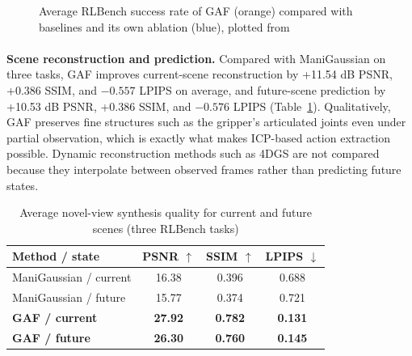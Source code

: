 \documentclass[12pt,a4paper,final]{extreport}
\begin{document}
\begin{figure}[htbp]
\centering
{}
\caption{Average RLBench success rate of GAF (orange) compared with baselines and its own ablation (blue), plotted from \cite{p2}}
\label{fig:gaf_chart}
\end{figure}

\paragraph{} \textbf{Scene reconstruction and prediction.} Compared with ManiGaussian on three tasks, GAF improves current-scene reconstruction by +11.54 dB PSNR, +0.386 SSIM, and $-0.557$ LPIPS on average, and future-scene prediction by +10.53 dB PSNR, +0.386 SSIM, and $-0.576$ LPIPS (Table~\ref{tab:gaf_nvs}). Qualitatively, GAF preserves fine structures such as the gripper's articulated joints even under partial observation, which is exactly what makes ICP-based action extraction possible. Dynamic reconstruction methods such as 4DGS are not compared because they interpolate between observed frames rather than predicting future states.

{\renewcommand{\arraystretch}{1.2}
\begin{table}[htbp]
\centering
\caption{Average novel-view synthesis quality for current and future scenes (three RLBench tasks) \cite{p2}}\label{tab:gaf_nvs}
\small
\begin{tabular}{|l|c|c|c|}
\hline
\textbf{Method / state} & \textbf{PSNR} $\uparrow$ & \textbf{SSIM} $\uparrow$ & \textbf{LPIPS} $\downarrow$ \\ \hline
ManiGaussian / current & 16.38 & 0.396 & 0.688 \\ \hline
ManiGaussian / future & 15.77 & 0.374 & 0.721 \\ \hline
\textbf{GAF / current} & \textbf{27.92} & \textbf{0.782} & \textbf{0.131} \\ \hline
\textbf{GAF / future} & \textbf{26.30} & \textbf{0.760} & \textbf{0.145} \\ \hline
\end{tabular}
\end{table}}
\end{document}
